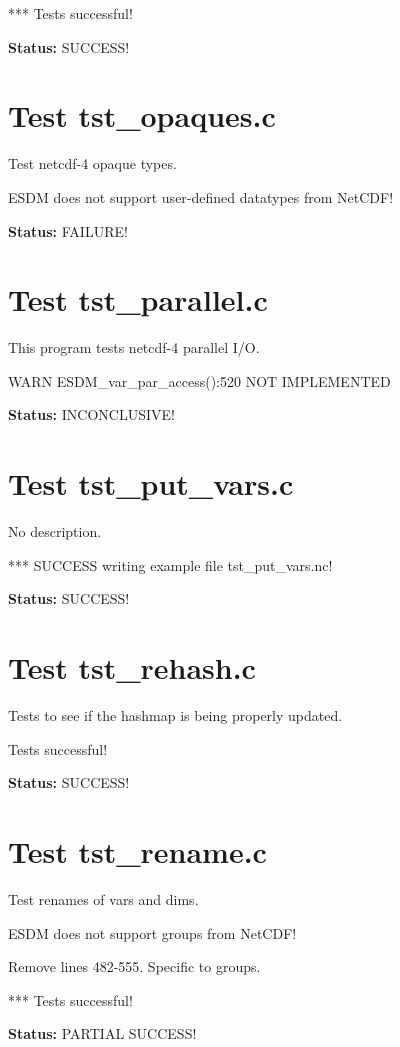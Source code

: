 *** Tests successful!

{\bf \large Status: } SUCCESS!

\section{Test tst\_opaques.c}

Test netcdf-4 opaque types.

ESDM does not support user-defined datatypes from NetCDF!

{\bf \large Status: } FAILURE!

\section{Test tst\_parallel.c}

This program tests netcdf-4 parallel I/O.

WARN ESDM\_var\_par\_access():520 NOT IMPLEMENTED

{\bf \large Status: } INCONCLUSIVE!

\section{Test tst\_put\_vars.c}

No description.

*** SUCCESS writing example file tst\_put\_vars.nc!

{\bf \large Status: } SUCCESS!

\section{Test tst\_rehash.c}

Tests to see if the hashmap is being properly updated.

Tests successful!

{\bf \large Status: } SUCCESS!

\section{Test tst\_rename.c}

Test renames of vars and dims.

ESDM does not support groups from NetCDF!

Remove lines 482-555. Specific to groups.

*** Tests successful!

{\bf \large Status: } PARTIAL SUCCESS!

